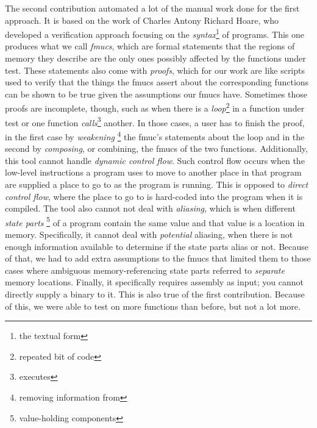 {  The second contribution automated a lot of the manual work done for the first approach.
  It is based on the work of Charles Antony Richard Hoare, who developed a verification approach focusing on the \emph{syntax}\footnote{the textual form} of programs.
  This one produces what we call \emph{\acp{fmuc}}, which are formal statements that the regions of memory they describe are the only ones possibly affected by the functions under test.
  These statements also come with \emph{proofs}, which for our work are like scripts used to verify that the things the \acp{fmuc} assert about the corresponding functions can be shown to be true given the assumptions our \acp{fmuc} have.
  Sometimes those proofs are incomplete, though, such as when there is a \emph{loop}\footnote{repeated bit of code} in a function under test or one function \emph{calls}\footnote{executes} another.
  In those cases, a user has to finish the proof, in the first case by \emph{weakening}%
  \footnote{removing information from}
  the \ac{fmuc}'s statements about the loop and in the second by \emph{composing}, or combining, the \acp{fmuc} of the two functions.
  Additionally, this tool cannot handle \emph{dynamic control flow}.
  Such control flow occurs when the low-level instructions a program uses to move to another place in that program are supplied a place to go to as the program is running.
  This is opposed to \emph{direct control flow}, where the place to go to is hard-coded into the program when it is compiled.
  The tool also cannot not deal with \emph{aliasing}, which is when different \emph{state parts}%
  \footnote{value-holding components}
  of a program contain the same value and that value is a location in memory.
  Specifically, it cannot deal with \emph{potential} aliasing, when there is not enough information available to determine if the state parts alias or not.
  Because of that, we had to add extra assumptions to the \acp{fmuc} that limited them to those cases where ambiguous memory-referencing state parts referred to \emph{separate} memory locations.
  Finally, it specifically requires assembly as input; you cannot directly supply a binary to it.
  This is also true of the first contribution.
  Because of this, we were able to test on more functions than before, but not a lot more.

}
